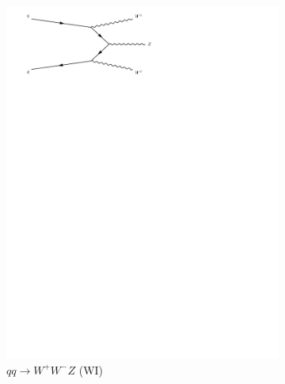 \begin{figure}[h]
\begin{subfigure}[b]{0.3\textwidth}
    \includegraphics[trim={0.5cm 22cm 10cm 0cm},width=\textwidth]{../Diagrams/D10.pdf}
    \caption{$qq\rightarrow W^{+}W^{-}Z$ (WI)}
    \label{fey:10}
  \end{subfigure}%
  ~
  \begin{subfigure}[b]{0.3\textwidth}

\end{subfigure}
\end{figure}
